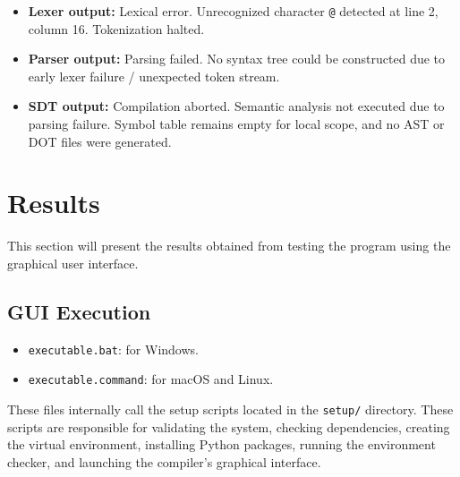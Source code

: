 \documentclass[letterpaper,12pt,oneside]{article}
\begin{document}
\begin{itemize}
    \item \textbf{Lexer output:} Lexical error. Unrecognized character \texttt{@} detected at line 2, column 16. Tokenization halted.
    \item \textbf{Parser output:} Parsing failed. No syntax tree could be constructed due to early lexer failure / unexpected token stream.
    \item \textbf{SDT output:} Compilation aborted. Semantic analysis not executed due to parsing failure. Symbol table remains empty for local scope, and no AST or DOT files were generated.
\end{itemize}




























\section{Results}

This section will present the results obtained from testing the program using the graphical user interface.

\subsection{GUI Execution}

\begin{itemize}
	\item \texttt{executable.bat}: for Windows.
	\item \texttt{executable.command}: for macOS and Linux.
\end{itemize}

These files internally call the setup scripts located in the \texttt{setup/} directory. These scripts are responsible for validating the system, checking dependencies, creating the virtual environment, installing Python packages, running the environment checker, and launching the compiler's graphical interface.
\end{document}
